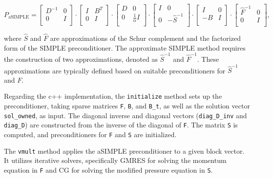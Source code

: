 \documentclass{article}
\begin{document}
\begin{equation}
    P_{\text{aSIMPLE}} =
    \begin{bmatrix}
        D^{-1} & 0 \\
        0 & I \\
    \end{bmatrix}
    \cdot
    \begin{bmatrix}
        I & B^T \\
        0 & I \\
    \end{bmatrix}
    \cdot
    \begin{bmatrix}
        D & 0 \\
        0 & \frac{1}{\alpha}I \\
    \end{bmatrix}
    \cdot
    \begin{bmatrix}
        I & 0\\
        0 & -\hat{S}^{-1} \\
    \end{bmatrix}
    \cdot
    \begin{bmatrix}
        I & 0 \\
        -B & I \\
    \end{bmatrix}
    \cdot
    \begin{bmatrix}
        \hat{F}^{-1} & 0 \\
        0 & I \\
    \end{bmatrix},
\end{equation}

where \(\hat{S}\) and \(\hat{F}\) are approximations of the Schur complement and the factorized form of the SIMPLE preconditioner.
The approximate SIMPLE method requires the construction of two approximations, denoted as \(\hat{S}^{-1}\) and \(\hat{F}^{-1}\). These approximations are typically defined based on suitable preconditioners for \(\hat{S}^{-1}\) and \(F\).


Regarding the c++ implementation, the \texttt{initialize} method sets up the preconditioner, taking sparse matrices \texttt{F}, \texttt{B}, and \texttt{B\_t}, as well as the solution vector \texttt{sol\_owned}, as input. The diagonal inverse and diagonal vectors (\texttt{diag\_D\_inv} and \texttt{diag\_D}) are constructed from the inverse of the diagonal of \texttt{F}. The matrix \texttt{S} is computed, and preconditioners for \texttt{F} and \texttt{S} are initialized.

The \texttt{vmult} method applies the aSIMPLE preconditioner to a given block vector. It utilizes iterative solvers, specifically GMRES for solving the momentum equation in \texttt{F} and CG for solving the modified pressure equation in \texttt{S}.
\end{document}
